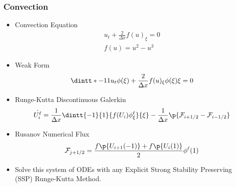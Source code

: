 \documentclass[10pt]{beamer}
\begin{document}
    \begin{frame}
      \frametitle{Convection}
      \begin{itemize}
        \item Convection Equation
          \begin{gather*}
            u_t + \frac{2}{\Delta x} f(u)_\xi = 0 \\
            f(u) = u^2 - u^3
          \end{gather*}

        \item Weak Form
          \[
            \dintt*{-1}{1}{u_t \phi(\xi) + \frac{2}{\Delta x}f(u)_\xi \phi(\xi)}{\xi} = 0
          \]

        \item Runge-Kutta Discontinuous Galerkin
          \[
            \dot{U_i^{\ell}} = \frac{1}{\Delta x}\dintt{-1}{1}{f(U_i)\phi_{\xi}^{\ell}}{\xi} - \frac{1}{\Delta x} \p{\mcF_{i + 1/2} - \mcF_{i - 1/2}}
          \]

        \item Rusanov Numerical Flux
          \[
            \mcF_{j+1/2} = \frac{f\p{U_{i+1}(-1)} + f\p{U_{i}(1)}}{2} \phi^{\ell}(1)
          \]

        \item Solve this system of ODEs with any Explicit Strong Stability Preserving (SSP) Runge-Kutta Method.
      \end{itemize}
    \end{frame}
\end{document}

